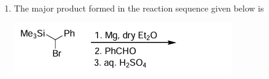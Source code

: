 \documentclass[journal,12pt,onecolumn]{IEEEtran}
\theoremstyle{remark}
\begin{document}
\begin{enumerate}
\begin{enumerate}
        \hfill{}
    \end{enumerate}

\item The major product formed in the reaction sequence given below is
    \begin{center}
      
        \includegraphics[width=0.7\columnwidth]{figs/q31.png}
    \end{center}
    \begin{enumerate}
      

\end{enumerate}
\end{enumerate}
\end{document}
